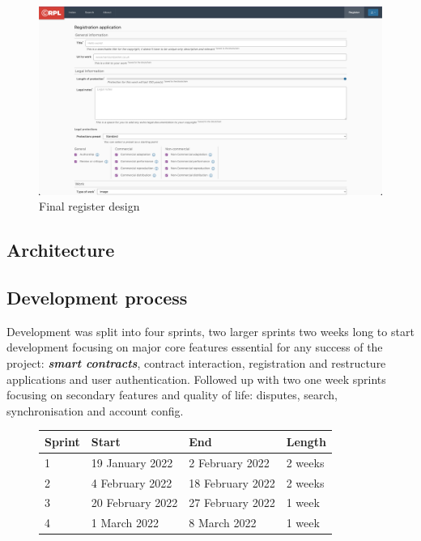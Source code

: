 \documentclass[12pt]{article}
\newcommand{\keyword}[1]{\textbf{\textit{#1}}}
\begin{document}
\begin{figure}[H]
\caption{Final register design}
\centering
\includegraphics[width=\textwidth,height=0.5\textheight,keepaspectratio]{images/wireframe/register-real}
\end{figure}

\subsection{Architecture}

\subsection{Development process}

Development was split into four sprints, two larger sprints two weeks long to start development focusing on major core features essential for any success of the project: \keyword{smart contracts}, contract interaction, registration and restructure applications and user authentication. Followed up with two one week sprints focusing on secondary features and quality of life: disputes, search, synchronisation and account config. 

\begin{figure}[H]
\hfil
\begin{tabular}{|l|l|l|l|}
\hline
Sprint & Start            & End              & Length  \\ \hline
1      & 19 January 2022  & 2 February 2022  & 2 weeks \\ \hline
2      & 4 February 2022  & 18 February 2022 & 2 weeks \\ \hline
3      & 20 February 2022 & 27 February 2022 & 1 week  \\ \hline
4      & 1 March 2022     & 8 March 2022     & 1 week  \\ \hline
\end{tabular}
\end{figure}
\end{document}
